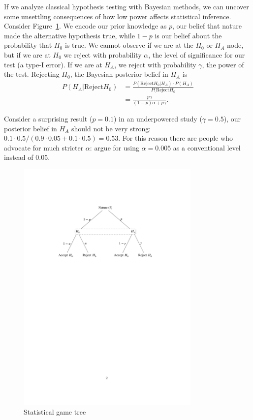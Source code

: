 \documentclass[twoside]{article}
\begin{document}
If we analyze classical hypothesis testing with Bayesian methods, we can uncover some
unsettling consequences of how low power affects statistical inference. 
Consider Figure~\ref{fig:B}. We encode our prior knowledge as $p$, our belief that
nature made the alternative hypothesis true, while $1-p$ is our belief about
the probability that $H_0$ is true. We cannot observe if we are at the $H_0$ or $H_A$ node,
but if we are at $H_0$ we reject with probability $\alpha$, the level of significance for our
test (a type-I error). If we are at $H_A$, we reject with probability $\gamma$, the power of the
test. Rejecting $H_0$, the Bayesian posterior belief in $H_A$ is
\begin{align*}
   P(H_A|\mathrm{Reject} H_0) & = \frac{P(\mathrm{Reject} H_0|H_A) \cdot P(H_A)}{P(\mathrm{Reject} H_0} \\
   &= \frac{p\gamma}{(1-p)\alpha + p\gamma}.  
\end{align*}

Consider a surprising result ($p=0.1$) in an underpowered study ($\gamma=0.5$), our posterior belief
in $H_A$ should not be very strong: $0.1\cdot 0.5 / (0.9\cdot 0.05 + 0.1\cdot 0.5) = 0.53$.
For this reason there are people who advocate for much stricter $\alpha$: \citet{Benjamin2017} argue
for using $\alpha=0.005$ as a conventional level instead of $0.05$. 

\begin{figure}[tb]
  \begin{center}
\includegraphics[width=0.8\textwidth]{../graphs/B.pdf}
  \end{center}
\caption{Statistical game tree}\label{fig:B}
\end{figure}
\end{document}
